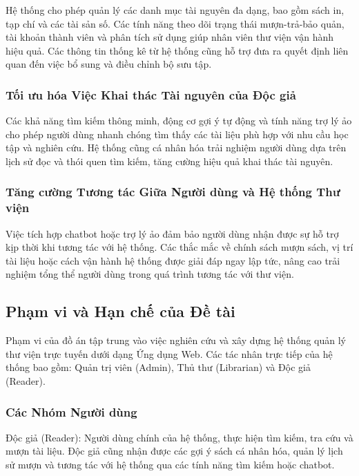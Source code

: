 Hệ thống cho phép quản lý các danh mục tài nguyên đa dạng, bao gồm sách in, tạp chí và các tài sản số. Các tính năng theo dõi trạng thái mượn-trả-bảo quản, tài khoản thành viên và phân tích sử dụng giúp nhân viên thư viện vận hành hiệu quả. Các thông tin thống kê từ hệ thống cũng hỗ trợ đưa ra quyết định liên quan đến việc bổ sung và điều chỉnh bộ sưu tập.

\subsubsection{Tối ưu hóa Việc Khai thác Tài nguyên của Độc giả}

Các khả năng tìm kiếm thông minh, động cơ gợi ý tự động và tính năng trợ lý ảo cho phép người dùng nhanh chóng tìm thấy các tài liệu phù hợp với nhu cầu học tập và nghiên cứu. Hệ thống cũng cá nhân hóa trải nghiệm người dùng dựa trên lịch sử đọc và thói quen tìm kiếm, tăng cường hiệu quả khai thác tài nguyên.

\subsubsection{Tăng cường Tương tác Giữa Người dùng và Hệ thống Thư viện}

Việc tích hợp chatbot hoặc trợ lý ảo đảm bảo người dùng nhận được sự hỗ trợ kịp thời khi tương tác với hệ thống. Các thắc mắc về chính sách mượn sách, vị trí tài liệu hoặc cách vận hành hệ thống được giải đáp ngay lập tức, nâng cao trải nghiệm tổng thể người dùng trong quá trình tương tác với thư viện.

\subsection{Phạm vi và Hạn chế của Đề tài}

Phạm vi của đồ án tập trung vào việc nghiên cứu và xây dựng hệ thống quản lý thư viện trực tuyến dưới dạng Ứng dụng Web. Các tác nhân trực tiếp của hệ thống bao gồm: Quản trị viên (Admin), Thủ thư (Librarian) và Độc giả (Reader).

\subsubsection{Các Nhóm Người dùng}

Độc giả (Reader): Người dùng chính của hệ thống, thực hiện tìm kiếm, tra cứu và mượn tài liệu. Độc giả cũng nhận được các gợi ý sách cá nhân hóa, quản lý lịch sử mượn và tương tác với hệ thống qua các tính năng tìm kiếm hoặc chatbot.

